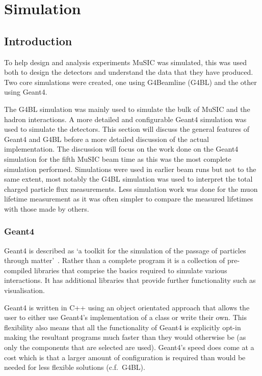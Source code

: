 \chapter{Simulation} %
\label{prt:simulation}
\section{Introduction} %
\label{cha:sim_introduction}
To help design and analysis experiments MuSIC was simulated, this was used both to design the detectors and understand the data that they have produced. Two core simulations were created, one using G4Beamline (G4BL) and the other using Geant4. 

The G4BL simulation was mainly used to simulate the bulk of MuSIC and the hadron interactions. A more detailed and configurable Geant4 simulation was used to simulate the detectors. This section will discuss the general features of Geant4 and G4BL before a more detailed discussion of the actual implementation. The discussion will focus on the work done on the Geant4 simulation for the fifth MuSIC beam time as this was the most complete simulation performed. Simulations were used in earlier beam runs but not to the same extent, most notably the G4BL simulation was used to interpret the total charged particle flux measurements. Less simulation work was done for the muon lifetime measurement as it was often simpler to compare the measured lifetimes with those made by others.

\subsection{Geant4} %
\label{sec:geant4}
Geant4 is described as `a toolkit for the simulation of the passage of particles through matter'~\cite{Geant4 REF}. Rather than a complete program it is a collection of pre-compiled libraries that comprise the basics required to simulate various interactions. It has additional libraries that provide further functionality such as visualisation. 

Geant4 is written in C++ using an object orientated approach that allows the user to either use Geant4's implementation of a class or write their own. This flexibility also means that all the functionality of Geant4 is explicitly opt-in making the resultant programs much faster than they would otherwise be (as only the components that are selected are used). Geant4's speed does come at a cost which is that a larger amount of configuration is required than would be needed for less flexible solutions (c.f.\ G4BL).

